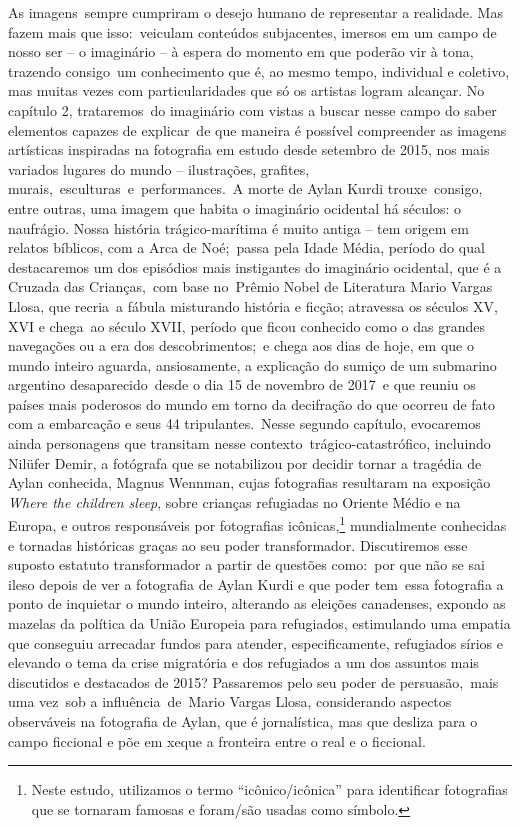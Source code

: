 \documentclass[
  letterpaper,
  a4paper,
  12pt]{scrbook}
\begin{document}
As imagens~sempre cumpriram o desejo humano de representar a realidade.
Mas fazem mais que isso:~veiculam conteúdos subjacentes, imersos em um
campo de nosso ser -- o imaginário -- à espera do momento em que poderão
vir à tona, trazendo consigo~um conhecimento que é, ao mesmo tempo,
individual e coletivo, mas muitas vezes com particularidades que só os
artistas logram alcançar. No capítulo 2, trataremos~do imaginário com
vistas a buscar nesse campo do saber elementos capazes de explicar~de
que maneira é possível compreender as imagens artísticas inspiradas na
fotografia em estudo desde setembro de 2015, nos mais variados lugares
do mundo -- ilustrações, grafites, murais,~esculturas~e~performances.~A
morte de Aylan Kurdi trouxe~consigo, entre outras, uma imagem que habita
o imaginário ocidental há séculos: o naufrágio. Nossa história
trágico-marítima é muito antiga -- tem origem em relatos bíblicos, com a
Arca de Noé;~passa pela Idade Média, período do qual destacaremos um dos
episódios mais instigantes do imaginário ocidental, que é a Cruzada das
Crianças,~com base no~Prêmio Nobel de Literatura Mario Vargas Llosa, que
recria~a fábula misturando história e ficção; atravessa os séculos XV,
XVI e chega~ao século XVII, período que ficou conhecido como o das
grandes navegações ou a era dos descobrimentos;~e chega aos dias de
hoje, em que o mundo inteiro aguarda, ansiosamente, a explicação do
sumiço de um submarino argentino desaparecido~desde o dia 15 de novembro
de 2017~e que reuniu os países mais poderosos do mundo em torno da
decifração do que ocorreu de fato com a embarcação e seus 44
tripulantes.~Nesse segundo capítulo, evocaremos ainda personagens que
transitam nesse contexto~trágico-catastrófico, incluindo Nilüfer Demir,
a fotógrafa que se notabilizou por decidir tornar a tragédia de Aylan
conhecida, Magnus Wennman, cujas fotografias resultaram na exposição
\emph{Where the children sleep}, sobre crianças refugiadas no Oriente
Médio e na Europa, e outros responsáveis por fotografias
icônicas,\footnote{Neste estudo, utilizamos o termo ``icônico/icônica''
  para identificar fotografias que se tornaram famosas e foram/são
  usadas como símbolo.} mundialmente conhecidas e tornadas históricas
graças ao seu poder transformador. Discutiremos esse suposto estatuto
transformador a partir de questões como:~por que não se sai ileso depois
de ver a fotografia de Aylan Kurdi e que poder tem~essa fotografia a
ponto de inquietar o mundo inteiro, alterando as eleições canadenses,
expondo as mazelas da política da União Europeia para refugiados,
estimulando uma empatia que conseguiu arrecadar fundos para atender,
especificamente, refugiados sírios e elevando o tema da crise migratória
e dos refugiados a um dos assuntos mais discutidos e destacados de 2015?
Passaremos pelo seu poder de persuasão,~mais uma vez~sob a
influência~de~Mario Vargas Llosa, considerando aspectos observáveis na
fotografia de Aylan, que é jornalística, mas que desliza para o campo
ficcional e põe em xeque a fronteira entre o real e o ficcional.~
\end{document}
